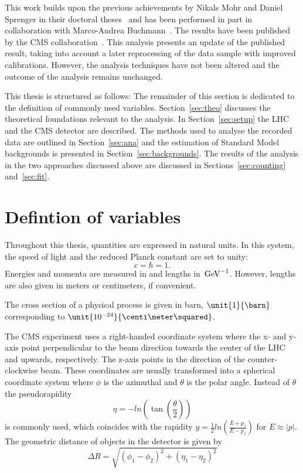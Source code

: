 This work builds upon the previous achievements by Nikals Mohr and Daniel Sprenger in their doctoral theses~\cite{Mohr:1423334,Sprenger:1501963} and has been performed in part in collaboration with Marco-Andrea Buchmann~\cite{Buchmann:1704399}. The results have been published by the CMS collaboration~\cite{Khachatryan:2015lwa}. This analysis presents an update of the published result, taking into account a later reprocessing of the data sample with improved calibrations. However, the analysis techniques have not been altered and the outcome of the analysis remains unchanged.

This thesis is structured as follows: The remainder of this section is dedicated to the definition of commonly used variables. Section~\ref{sec:theo} discusses the theoretical foundations relevant to the analysis. In Section~\ref{sec:setup} the LHC and the CMS detector are described. The methods used to analyse the recorded data are outlined in Section~\ref{sec:ana} and the estimation of Standard Model backgrounds is presented in Section~\ref{sec:backgrounds}. The results of the analysis in the two approaches discussed above are discussed in Sections~\ref{sec:counting} and~\ref{sec:fit}. 

\section{Defintion of variables}
\label{sec:variables}
Throughout this thesis, quantities are expressed in natural units. In this system, the speed of light and the reduced Planck constant are set to unity:
\begin{equation}
c = \hbar = 1.
\end{equation} 
Energies and momenta are measured in \GeV and lengths in $\text{\ensuremath{\,\mathrm{Ge\hspace{-.08em}V}}}^{-1}$. However, lengths are also given in meters or centimeters, if convenient. 

The cross section of a physical process is given in barn, $\unit{1}{\barn}$ corresponding to $\unit{10^{-24}}{\centi\meter\squared}$.   

The CMS experiment uses a right-handed coordinate system where the x- and y-axis point perpendicular to the beam direction towards the center of the LHC and upwards, respectively. The z-axis points in the direction of the counter-clockwise beam.  These coordinates are usually transformed into a spherical coordinate system where $\phi$ is the azimuthal and $\theta$ is the polar angle. Instead of $\theta$ the pseudorapidity 
\begin{equation}
\eta = -ln \left( \tan\left(\frac{\theta}{2}\right)\right)
\end{equation}
is commonly used, which coincides with the rapidity $y = \frac{1}{2} ln\left(\frac{E+p_z}{E-p_z}\right)$ for $E\approx |p|$. The geometric distance of objects in the detector is given by
\begin{equation}
\Delta R = \sqrt{(\phi_1 - \phi_2)^2 + (\eta_1 - \eta_2)^2}
\end{equation}

